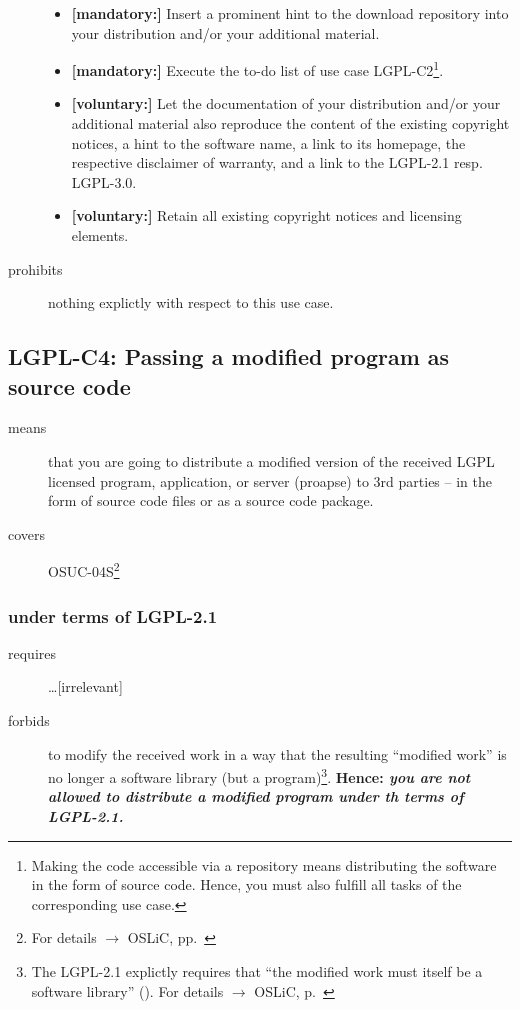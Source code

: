 \begin{description}
\begin{itemize}
  \item \textbf{[mandatory:]} Insert a prominent hint to the download repository
  into your distribution and/or your additional material.
  
  \item \textbf{[mandatory:]} Execute the to-do list of use case LGPL-C2\footnote{
  Making the code accessible via a repository means distributing the software in
  the form of source code. Hence, you must also fulfill all tasks of the
  corresponding use case.}.
   
  \item \textbf{[voluntary:]} Let the documentation of your distribution and/or
  your additional material also reproduce the content of the existing
  copyright notices, a hint to the software name, a link to its homepage,
  the respective disclaimer of warranty, and a link to the LGPL-2.1 resp.
  LGPL-3.0.
  
  \item \textbf{[voluntary:]} Retain all existing copyright notices and
  licensing elements.

\end{itemize}

\item[prohibits] nothing explictly with respect to this use case.

\end{description}

\subsection{LGPL-C4: Passing a modified program as source code}
\label{OSUC-04S-LGPL} 

\begin{description}
\item[means] that you are going to distribute a modified version of the received
LGPL licensed program, application, or server (proapse) to 3rd parties -- in the
form of source code files or as a source code package.
\item[covers] OSUC-04S\footnote{For details $\rightarrow$ OSLiC, pp.\
\pageref{OSUC-04S-DEF}}
\end{description}

\subsubsection{under terms of LGPL-2.1}

\begin{description}
  \item[requires] \ldots [irrelevant] 
  \item[forbids] to modify the received work in a way that the resulting
  \enquote{modified work} is no longer a software library (but a
  program)\footnote{The LGPL-2.1 explictly requires that \enquote{the modified
  work must itself be a software library} (\cite[cf.][\nopage wp.\
  §2a]{Lgpl21OsiLicense1999a}). For details $\rightarrow$ OSLiC, p.\
  \pageref{para:libislib}}. \textbf{Hence: \emph{you are not allowed to
  distribute a modified program under th terms of LGPL-2.1.}}
\end{description}

